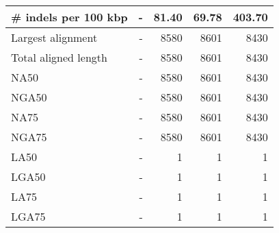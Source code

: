 \documentclass[12pt,a4paper]{article}
\begin{document}
\begin{table}[ht]
\begin{center}
\begin{tabular}{|l*{4}{|r}|}
\# indels per 100 kbp & - & 81.40 & 69.78 & 403.70 \\ \hline
Largest alignment & - & 8580 & 8601 & 8430 \\ \hline
Total aligned length & - & 8580 & 8601 & 8430 \\ \hline
NA50 & - & 8580 & 8601 & 8430 \\ \hline
NGA50 & - & 8580 & 8601 & 8430 \\ \hline
NA75 & - & 8580 & 8601 & 8430 \\ \hline
NGA75 & - & 8580 & 8601 & 8430 \\ \hline
LA50 & - & 1 & 1 & 1 \\ \hline
LGA50 & - & 1 & 1 & 1 \\ \hline
LA75 & - & 1 & 1 & 1 \\ \hline
LGA75 & - & 1 & 1 & 1 \\ \hline
\end{tabular}
\end{center}
\end{table}
\end{document}
